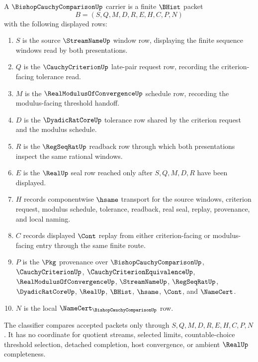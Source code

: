 \begin{definition}
\label{def:cauchy-criterion-comparison-chain}
A $\BishopCauchyComparisonUp$ carrier is a finite $\BHist$ packet
$$
B=(S,Q,M,D,R,E,H,C,P,N)
$$
with the following displayed rows:
\begin{enumerate}
\item $S$ is the source $\StreamNameUp$ window row, displaying the finite sequence windows read by both presentations.
\item $Q$ is the $\CauchyCriterionUp$ late-pair request row, recording the criterion-facing tolerance read.
\item $M$ is the $\RealModulusOfConvergenceUp$ schedule row, recording the modulus-facing threshold handoff.
\item $D$ is the $\DyadicRatCoreUp$ tolerance row shared by the criterion request and the modulus schedule.
\item $R$ is the $\RegSeqRatUp$ readback row through which both presentations inspect the same rational windows.
\item $E$ is the $\RealUp$ seal row reached only after $S,Q,M,D,R$ have been displayed.
\item $H$ records componentwise $\hsame$ transport for the source windows, criterion request, modulus schedule, tolerance, readback, real seal, replay, provenance, and local naming.
\item $C$ records displayed $\Cont$ replay from either criterion-facing or modulus-facing entry through the same finite route.
\item $P$ is the $\Pkg$ provenance over $\BishopCauchyComparisonUp$, $\CauchyCriterionUp$, $\CauchyCriterionEquivalenceUp$, $\RealModulusOfConvergenceUp$, $\StreamNameUp$, $\RegSeqRatUp$, $\DyadicRatCoreUp$, $\RealUp$, $\BHist$, $\hsame$, $\Cont$, and $\NameCert$.
\item $N$ is the local $\NameCert_{\BishopCauchyComparisonUp}$ row.
\end{enumerate}
The classifier compares accepted packets only through $S,Q,M,D,R,E,H,C,P,N$. It has no coordinate for quotient streams, selected limits, countable-choice threshold selection, detached completion, host convergence, or ambient $\RealUp$ completeness.
\end{definition}

